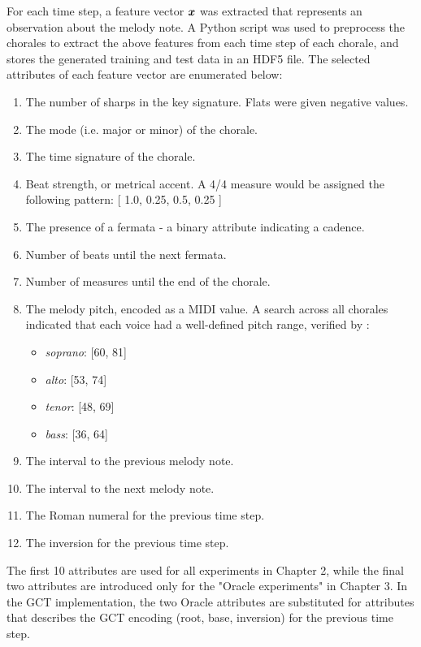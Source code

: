 \documentclass[11pt]{article}
\begin{document}
For each time step, a feature vector $\boldsymbol{x}$ was extracted that represents an observation about the melody note. A Python script was used to preprocess the chorales to extract the above features from each time step of each chorale, and stores the generated training and test data in an HDF5 file. The selected attributes of each feature vector are enumerated below:

\begin{enumerate}
\item The number of sharps in the key signature. Flats were given negative values.
\item The mode (i.e. major or minor) of the chorale.
\item The time signature of the chorale.
\item Beat strength, or metrical accent. A 4/4 measure would be assigned the following pattern: [ 1.0, 0.25, 0.5, 0.25 ]
\item The presence of a fermata - a binary attribute indicating a cadence.
\item Number of beats until the next fermata.
\item Number of measures until the end of the chorale.
\item The melody pitch, encoded as a MIDI value. A search across all chorales indicated that each voice had a well-defined pitch range, verified by \citet{madsen2002}: 
\begin{itemize}
\item \textit{soprano}: [60, 81]
\item \textit{alto}: [53, 74]
\item \textit{tenor}: [48, 69]
\item \textit{bass}: [36, 64]
\end{itemize}
\item The interval to the previous melody note.
\item The interval to the next melody note.
\item The Roman numeral for the previous time step.
\item The inversion for the previous time step.
\end{enumerate}

The first 10 attributes are used for all experiments in Chapter 2, while the final two attributes are introduced only for the "Oracle experiments" in Chapter 3. In the GCT implementation, the two Oracle attributes are substituted for attributes that describes the GCT encoding (root, base, inversion) for the previous time step. \\
\end{document}
